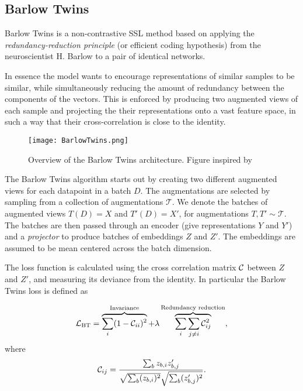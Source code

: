 \documentclass[../../thesis.tex]{subfiles}
\begin{document}
\subsection{Barlow Twins}
Barlow Twins is a non-contrastive SSL method based on applying the \textit{redundancy-reduction principle} (or efficient coding hypothesis) \cite{Barlow_origin} from the neuroscientist H. Barlow to a pair of identical networks.\newline  

In essence the model wants to encourage representations of similar samples to be similar, while simultaneously reducing the amount of redundancy between the components of the vectors. This is enforced by producing two augmented views of each sample and projecting the their representations onto a vast feature space, in such a way that their cross-correlation is close to the identity. \newline

\begin{figure}[h]
    \texttt{[image: BarlowTwins.png]}
    \centering    
    \caption{Overview of the Barlow Twins architecture. Figure inspired by \cite{zbontar2021barlow}}
\end{figure}

The Barlow Twins algorithm starts out by creating two different augmented views for each datapoint in a batch $D$. The augmentations are selected by sampling from a collection of augmentations $\mathcal{T}$. We denote the batches of augmented views $T(D) = X$ and $T'(D) =X'$, for augmentations $T,T'\sim \mathcal{T}$.  The batches are then passed through an encoder (give representations $Y$ and $Y'$) and a \textit{projector} to produce batches of embeddings $Z$ and $Z'$. The embeddings are assumed to be mean centered across the batch dimension. \newline

The loss function is calculated using the cross correlation matrix $\mathcal{C}$ between $Z$ and $Z'$, and measuring its deviance from the identity. In particular the Barlow Twins loss is defined as

\begin{equation}
    \mathcal{L}_{\text{BT}} = 
    \overbrace{\sum_i (1 - \mathcal{C}_{ii})^2}^{\text{Invariance}}
    +\lambda  \overbrace{\sum_i\sum_{j\neq i} \mathcal{C}_{ij}^2}^{\text{Redundancy reduction}},
\end{equation}
where
\begin{equation}
    \mathcal{C}_{ij} = \frac{\sum_b z_{b,i}z_{b,j}'}{\sqrt{\sum_b (z_{b,i})^2}\sqrt{\sum_b (z_{b,j}')^2}}.
\end{equation}
\end{document}
